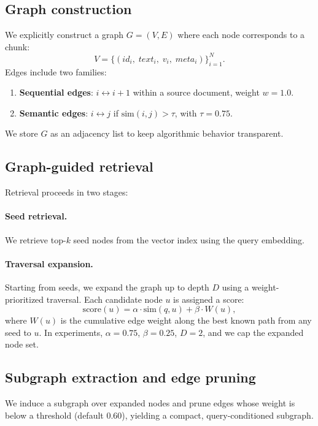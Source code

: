 \documentclass[11pt]{article}
\begin{document}
\subsection{Graph construction}
We explicitly construct a graph $G=(V,E)$ where each node corresponds to a chunk:
\begin{equation}
V=\{(id_i,\; text_i,\; v_i,\; meta_i)\}_{i=1}^{N}.
\end{equation}
Edges include two families:
\begin{enumerate}[leftmargin=*]
  \item \textbf{Sequential edges}: $i \leftrightarrow i{+}1$ within a source document, weight $w=1.0$.
  \item \textbf{Semantic edges}: $i \leftrightarrow j$ if $\mathrm{sim}(i,j) > \tau$, with $\tau=0.75$.
\end{enumerate}
We store $G$ as an adjacency list to keep algorithmic behavior transparent.

\subsection{Graph-guided retrieval}
Retrieval proceeds in two stages:
\paragraph{Seed retrieval.} We retrieve top-$k$ seed nodes from the vector index using the query embedding.
\paragraph{Traversal expansion.} Starting from seeds, we expand the graph up to depth $D$ using a weight-prioritized traversal. Each candidate node $u$ is assigned a score:
\begin{equation}
\mathrm{score}(u) = \alpha \cdot \mathrm{sim}(q,u) + \beta \cdot W(u),
\end{equation}
where $W(u)$ is the cumulative edge weight along the best known path from any seed to $u$.
In experiments, $\alpha=0.75$, $\beta=0.25$, $D=2$, and we cap the expanded node set.

\subsection{Subgraph extraction and edge pruning}
We induce a subgraph over expanded nodes and prune edges whose weight is below a threshold (default 0.60), yielding a compact, query-conditioned subgraph.
\end{document}
